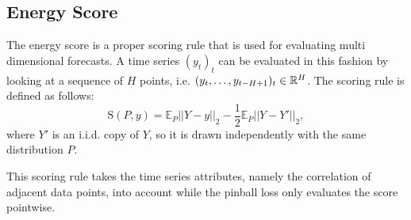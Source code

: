 \subsection{Energy Score}
\label{sec:energy-score-explanation}

The energy score is a proper scoring rule that is used for 
evaluating multi dimensional forecasts. A time series \((y_t)_t\) 
can be evaluated in this fashion by looking at a sequence of \(H\) 
points, i.e. \((y_t, \ldots, y_{t-H+1})_t \in \mathbb{R}^H\). 
The scoring rule is defined as follows:
\[ \mathrm{S}(P, y) = \mathbb{E}_P ||Y-y||_2 - \frac{1}{2} \mathbb{E}_P ||Y-Y'||_2, \]
where \(Y'\) is an i.i.d. copy of \(Y\), so it is drawn independently with the same distribution \(P\).

This scoring rule takes the time series attributes, namely the 
correlation of adjacent data points, into account while 
the pinball loss only evaluates the score pointwise.